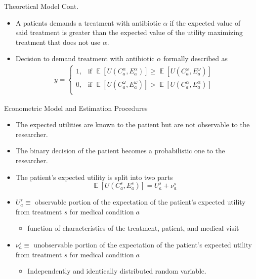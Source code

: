 \documentclass{beamer}
\DeclareMathOperator{\EX}{\mathbb{E}}
\begin{document}
\begin{frame}{Theoretical Model Cont.}
\begin{itemize}
\item A patients demands a treatment with antibiotic $\alpha$ if the expected value of said treatment is greater than the expected value of the utility maximizing treatment that does not use $\alpha$.
\item Decision to demand treatment with antibiotic $\alpha$ formally described as
\begin{eqnarray}
  y =
  \begin{cases}
    1, & \text{if }\EX[U(C_a^\alpha,E_a^\alpha)] \geq \EX[U(C_a^\omega,E_a^\omega)] \\
    0, & \text{if }\EX[U(C_a^\omega,E_a^\omega)] > \EX[U(C_a^\alpha,E_a^\alpha)] \\
  \end{cases}
\end{eqnarray}
\end{itemize}
\end{frame}

\begin{frame}{Econometric Model and Estimation Procedures}
\begin{itemize}
\item The expected utilities are known to the patient but are not observable to the researcher.
\item The binary decision of the patient becomes a probabilistic one to the researcher.
\item The patient's expected utility is split into two parts
\begin{equation}
  \EX[U(C_a^s,E_a^s)] = U_a^s + \nu_a^s
\end{equation}
\item $U_a^s \equiv$ observable portion of the expectation of the patient's expected utility from treatment $s$ for medical condition $a$
\begin{itemize}
  \item function of characteristics of the treatment, patient, and medical visit
\end{itemize}
\item $\nu_a^s \equiv$ unobservable portion of the expectation of the patient's expected utility from treatment $s$ for medical condition $a$
\begin{itemize}
  \item Independently and identically distributed random variable.
\end{itemize}
\end{itemize}
\end{frame}
\end{document}
